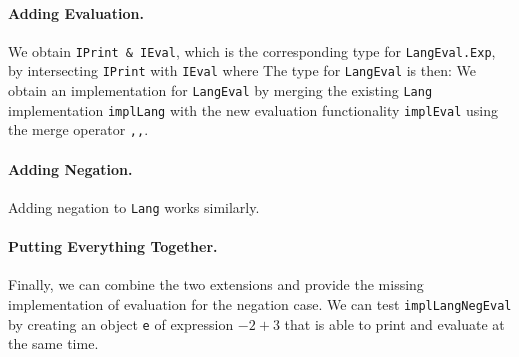 \paragraph{Adding Evaluation.}

We obtain \lstinline{IPrint & IEval}, which is the corresponding type for \lstinline{LangEval.Exp}, by
intersecting \lstinline{IPrint} with \lstinline{IEval} where
The type for \lstinline{LangEval} is then:
We obtain an implementation for \lstinline{LangEval} by merging the existing
\lstinline{Lang} implementation \lstinline{implLang} with the new evaluation
functionality \lstinline{implEval} using the merge operator \lstinline{,,}.

\paragraph{Adding Negation.}

Adding negation to \lstinline{Lang} works similarly.



\paragraph{Putting Everything Together.}
Finally, we can combine the two extensions and provide the missing
implementation of evaluation for the negation case.
We can test \lstinline{implLangNegEval} by creating an object \lstinline{e} of expression $-2 + 3$ that is able to print and evaluate at the same time.



